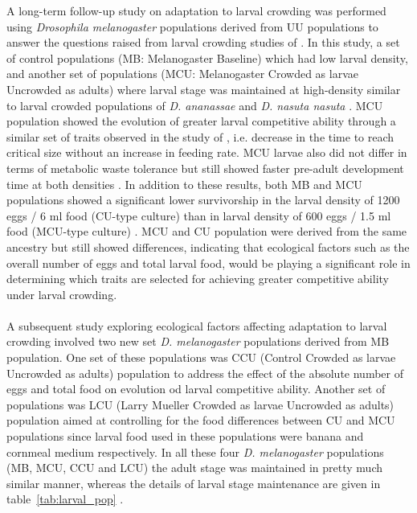 A  long-term follow-up study on adaptation to larval crowding was performed using \textit{Drosophila melanogaster} populations derived from UU populations to answer the questions raised from larval crowding studies of \citet{nagarajanAdaptationLarvalCrowding2016}. In this study, a set of control  populations (MB: Melanogaster Baseline) which had low larval density, and another set of populations (MCU: Melanogaster Crowded as larvae Uncrowded as adults) where larval stage was maintained at high-density similar to larval crowded populations of \textit{D. ananassae} and \textit{D. nasuta nasuta} \citep{sarangiEvolutionIncreasedLarval2016}. MCU population showed the evolution of greater larval competitive ability through a similar set of traits observed in the study of \citet{nagarajanAdaptationLarvalCrowding2016}, i.e. decrease in the time to reach critical size without an increase in feeding rate. MCU larvae also did not differ in terms of metabolic waste tolerance but still showed faster pre-adult development time at both densities \citep{sarangiEvolutionIncreasedLarval2016}. In addition to these results, both MB and MCU populations showed a significant lower survivorship in the larval density of 1200 eggs / 6 ml food (CU-type culture) than in larval density of 600 eggs / 1.5 ml food (MCU-type culture) \citep{sarangiPreliminaryInvestigationsCauses2013}. MCU and CU population were derived from the same ancestry but still showed differences, indicating that ecological factors such as the overall number of eggs and total larval food, would be playing a significant role in determining which traits are selected for achieving greater competitive ability under larval crowding. \\\\
A subsequent study exploring ecological factors affecting adaptation to larval crowding involved two new set \textit{D. melanogaster} populations derived from MB population. One set of these populations was CCU (Control Crowded as larvae Uncrowded as adults) population to address the effect of the absolute number of eggs and total food on evolution od larval competitive ability. Another set of populations was LCU (Larry Mueller Crowded as larvae Uncrowded as adults) population aimed at controlling for the food differences between CU and MCU populations since larval food used in these populations were banana and cornmeal medium respectively. In all these four \textit{D. melanogaster} populations (MB, MCU, CCU and LCU) the adult stage was maintained in pretty much similar manner, whereas the details of larval stage maintenance are given in table~\ref{tab:larval_pop} \citep{sarangiEcologicalDetailsMediate2018}.
